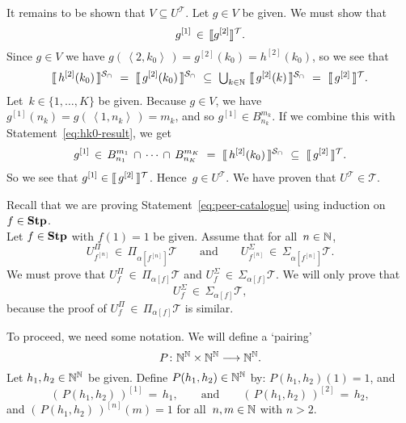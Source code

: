 \documentclass[main.tex]{subfiles}
\begin{document}
It remains to be shown that $V\subseteq U^{\mathcal{T}}$.
Let $g\in V$ be given.
We must show that 
\begin{equation*}
g^{[1]} \,\in\, \decode{g^{[2]}}^{\mathcal{T}}.
\end{equation*}
Since $g\in V$ 
we have $g(\,\left<2,k_0\right>\,) = g^{[2]}(k_0) = h^{[2]}(k_0)$,
so we see that
\begin{equation}
\label{eq:hk0-result}
\decode{\,h^{[2]}(k_0)\,}^{\mathcal{S}_\cap}\ =\ 
\decode{\,g^{[2]}(k_0)\,}^{\mathcal{S}_\cap}
\ \subseteq\ 
\textstyle{\bigcup_{k\in\N}}\ \decode{\,g^{[2]}(k)\,}^{\mathcal{S}_\cap}
\ = \ 
\decode{\,g^{[2]}\,}^{\mathcal{T}}.
\end{equation}
Let~$k\in\{1,\dotsc,K\}$
be given.
Because $g\in V$,
we have
 $g^{[1]}(n_k) = g(\,\left< 1,n_k\right>\,) = m_k$,
and so $g^{[1]} \in B^{m_k}_{n_k}$.
If we combine this with Statement~\eqref{eq:hk0-result}, we get
\begin{equation*}
g^{[1]} \,\in\, 
B^{m_1}_{n_1} 
\,\cap\,\dotsb\,\cap\,
B^{m_K}_{n_K}
\ =\ 
\decode{\,h^{[2]}(k_0)\,}^{\mathcal{S}_\cap}
\ \subseteq\ \decode{\,g^{[2]}\,}^{\mathcal{T}}.
\end{equation*}
So we see that $g^{[1]} \in \decode{\,g^{[2]}\,}^{\mathcal{T}}$.
Hence~$g\in U^{\mathcal{T}}$.
We have proven that $U^{\mathcal{T}} \in\mathcal{T}$.

\vspace{.6em}
\noindent
Recall that we are proving Statement~\eqref{eq:peer-catalogue}
using induction on~$f\in\mathbf{Stp}$.\\
Let $f\in\mathbf{Stp}$
with $f(1)=1$ be given.
Assume that for all~$n\in\mathbb{N}$,
\begin{equation*}
U^\Pi_{f^{[n]}} \,\in\, \Pi_{\alpha[f^{[n]}]}\mathcal{T}
\qquad\text{and}\qquad
U^\Sigma_{f^{[n]}} \,\in\, \Sigma_{\alpha[f^{[n]}]}\mathcal{T}.
\end{equation*}
We must prove that 
$U^\Pi_f \,\in\, \Pi_{\alpha[f]} \mathcal{T}$
and $U^\Sigma_f \,\in\, \Sigma_{\alpha[f]} \mathcal{T}$.
We will only prove that
\begin{equation}
\label{eq:peer-catalogue-induction}
U^\Sigma_f \,\in\, \Sigma_{\alpha[f]} \mathcal{T},
\end{equation}
because the proof of 
$U^\Pi_f \,\in\, \Pi_{\alpha[f]} \mathcal{T}$
is similar.

To proceed, we need some notation.
We will define a `pairing'
\begin{equation*}
P\colon \mathbb{N}^{\mathbb{N}} \times \mathbb{N}^{\mathbb{N}}\longrightarrow \mathbb{N}^{\mathbb{N}}.
\end{equation*}
Let $h_1,h_2\in\mathbb{N}^{\mathbb{N}}$ be given.
Define $P(h_1,h_2)\in\mathbb{N}^{\mathbb{N}}$
by: $P(h_1,h_2)(1) = 1$, and
\begin{equation*}
(\,P(h_1,h_2)\,)^{[1]} \,=\, h_1,
\qquad\text{and}\qquad
(\,P(h_1,h_2)\,)^{[2]} \,=\, h_2,
\end{equation*}
and $(\,P(h_1,h_2)\,)^{[n]}(m) = 1$
for all~$n,m\in\mathbb{N}$ with $n>2$.
\end{document}
